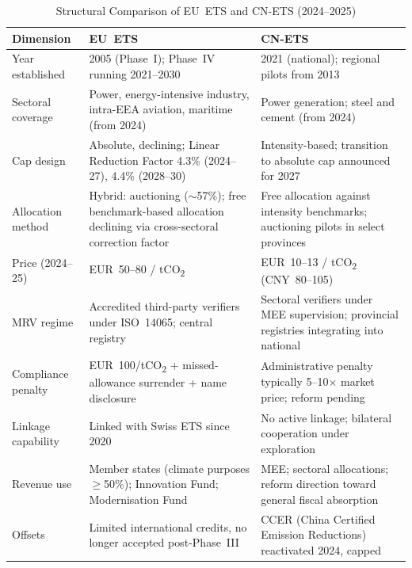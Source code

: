 \documentclass[letterpaper, 10pt, conference]{ieeeconf}
\begin{document}
\begin{table}[!t]
\caption{Structural Comparison of EU~ETS and CN-ETS (2024--2025)}
\label{tab:ets-comparison}
\centering
\renewcommand{\arraystretch}{1.20}
\footnotesize
\begin{tabular}{p{2.6cm}|p{6.4cm}|p{6.4cm}}
\toprule
\textbf{Dimension} & \textbf{EU~ETS} & \textbf{CN-ETS} \\
\midrule
Year established
  & 2005 (Phase~I); Phase~IV running 2021--2030
  & 2021 (national); regional pilots from 2013 \\
\midrule
Sectoral coverage
  & Power, energy-intensive industry, intra-EEA aviation, maritime (from 2024)
  & Power generation; steel and cement (from 2024) \\
\midrule
Cap design
  & Absolute, declining; Linear Reduction Factor 4.3\% (2024--27), 4.4\% (2028--30)
  & Intensity-based; transition to absolute cap announced for 2027 \\
\midrule
Allocation method
  & Hybrid: auctioning ($\sim$57\%); free benchmark-based allocation declining via cross-sectoral correction factor
  & Free allocation against intensity benchmarks; auctioning pilots in select provinces \\
\midrule
Price (2024--25)
  & EUR~50--80 / tCO\textsubscript{2}
  & EUR~10--13 / tCO\textsubscript{2} (CNY~80--105) \\
\midrule
MRV regime
  & Accredited third-party verifiers under ISO~14065; central registry
  & Sectoral verifiers under MEE supervision; provincial registries integrating into national \\
\midrule
Compliance penalty
  & EUR~100/tCO\textsubscript{2} + missed-allowance surrender + name disclosure
  & Administrative penalty typically 5--10$\times$ market price; reform pending \\
\midrule
Linkage capability
  & Linked with Swiss ETS since 2020
  & No active linkage; bilateral cooperation under exploration \\
\midrule
Revenue use
  & Member states (climate purposes $\geq$50\%); Innovation Fund; Modernisation Fund
  & MEE; sectoral allocations; reform direction toward general fiscal absorption \\
\midrule
Offsets
  & Limited international credits, no longer accepted post-Phase~III
  & CCER (China Certified Emission Reductions) reactivated 2024, capped \\
\bottomrule
\end{tabular}
\end{table}
\end{document}

